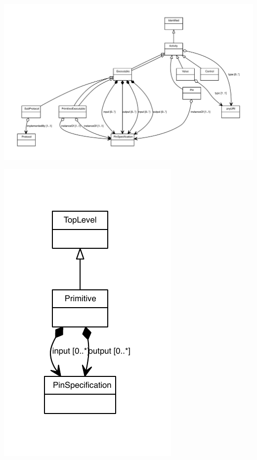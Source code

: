 \begin{center}
\includegraphics[width=\textwidth]{uml/PrimitiveExecutable_abstraction_hierarchy.pdf}
\end{center}



\begin{center}
\includegraphics[scale=0.8]{uml/Primitive_abstraction_hierarchy.pdf}
\end{center}



